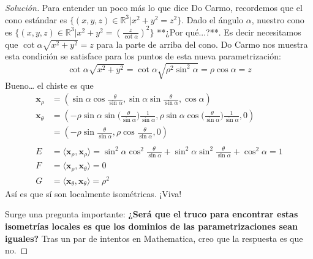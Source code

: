 \documentclass[spanish]{book}
\theoremstyle{definition}
\begin{document}
\begin{proof}[Solución]
	Para entender un poco más lo que dice Do Carmo, recordemos que el cono estándar es $\{(x,y,z)\in\mathbb{R}^3|x^2+y^2=z^2\}$. Dado el ángulo $\alpha$, nuestro cono es $\{(x,y,z)\in\mathbb{R}^3|x^2+y^2=(\frac{z}{\cot\alpha})^2\}$ **¿Por qué...?**.  Es decir necesitamos que $\cot{\alpha}\sqrt{x^2+y^2}=z$ para la parte de arriba del cono. Do Carmo nos muestra esta condición se satisface para los puntos de esta nueva parametrización:
	\[\cot\alpha\sqrt{x^2+y^2}=\cot\alpha\sqrt{\rho^2\sin^2\alpha}=\rho\cos\alpha=z\]
	Bueno… el chiste es que
	\begin{align*}
		\mathbf{x}_\rho&=(\sin\alpha\cos{\frac{\theta}{\sin{\alpha}}},\sin\alpha\sin{\frac{\theta}{\sin{\alpha}}},\cos\alpha)\\
		\mathbf{x}_\theta&=(-\rho\sin\alpha\sin\big({\frac{\theta}{\sin{\alpha}}}\big)\frac{1}{\sin\alpha},\rho\sin\alpha\cos\big({\frac{\theta}{\sin{\alpha}}}\big)\frac{1}{\sin\alpha},0)\\
		&=(-\rho\sin{\frac{\theta}{\sin{\alpha}}},\rho\cos{\frac{\theta}{\sin{\alpha}}},0) \\\\
		{E}&=\langle \mathbf{{x}}_\rho,\mathbf{{x}}_\rho\rangle=\sin^2\alpha\cos^2{\frac{\theta}{\sin{\alpha}}}+\sin^2\alpha\sin^2{\frac{\theta}{\sin{\alpha}}}+\cos^2\alpha=1\\
		{F}&=\langle \mathbf{{x}}_\rho,\mathbf{{x}}_\theta\rangle=0\\
		{G}&=\langle \mathbf{{x}}_\theta,\mathbf{{x}}_\theta\rangle=\rho^2
	\end{align*}
	Así es que sí son localmente isométricas. ¡Viva!
	
	Surge una pregunta importante: \textbf{¿Será que el truco para encontrar estas isometrías locales es que los dominios de las parametrizaciones sean iguales?} Tras un par de intentos en Mathematica, creo que la respuesta es que no.
\end{proof}
\end{document}
